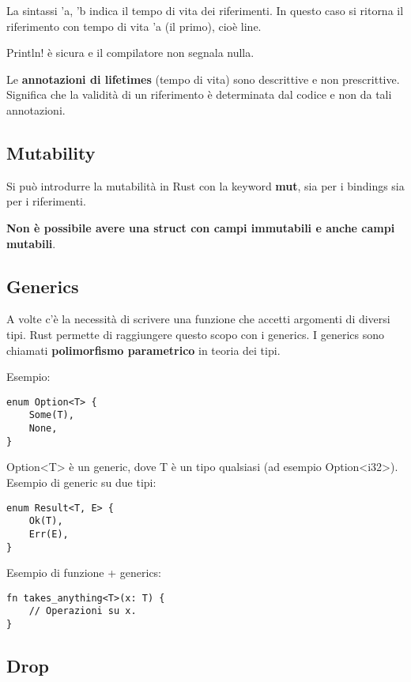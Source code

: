 La sintassi 'a, 'b indica il tempo di vita dei riferimenti.
In questo caso si ritorna il riferimento con tempo di vita 'a (il primo),
cioè line.

Println! è sicura e il compilatore non segnala nulla.

Le \textbf{annotazioni di lifetimes} (tempo di vita) sono descrittive e non
prescrittive. Significa che la validità di un riferimento è determinata dal
codice e non da tali annotazioni.

\subsection{Mutability}

Si può introdurre la mutabilità in Rust con la keyword \textbf{mut}, sia per i
bindings sia per i riferimenti.

\textbf{Non è possibile avere una struct con campi immutabili e anche campi
mutabili}.

\subsection{Generics}

A volte c’è la necessità di scrivere una funzione che accetti argomenti di
diversi tipi. Rust permette di raggiungere questo scopo con i generics.
I generics sono chiamati \textbf{polimorfismo parametrico} in teoria dei tipi.

Esempio:

\begin{lstlisting}
enum Option<T> {
    Some(T),
    None,
}
\end{lstlisting}

Option<T> è un generic, dove T è un tipo qualsiasi (ad esempio Option<i32>).
Esempio di generic su due tipi:

\begin{lstlisting}
enum Result<T, E> {
    Ok(T),
    Err(E),
}
\end{lstlisting}

Esempio di funzione + generics:

\begin{lstlisting}
fn takes_anything<T>(x: T) {
    // Operazioni su x.
}
\end{lstlisting}

\subsection{Drop}

